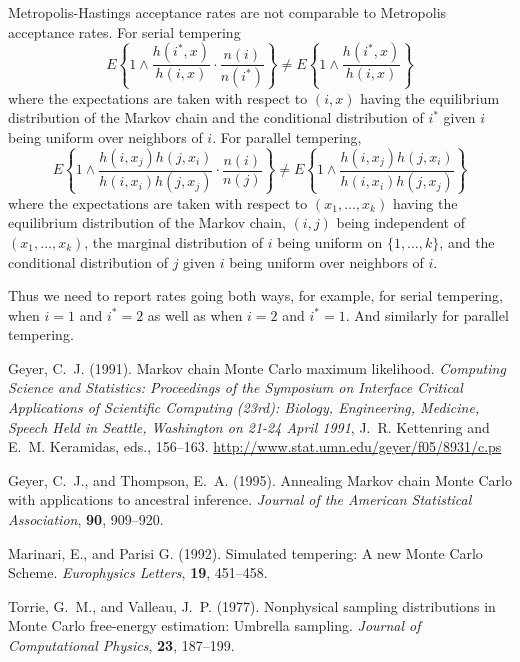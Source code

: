 \documentclass[11pt]{article}
\begin{document}
Metropolis-Hastings acceptance rates are not comparable
to Metropolis acceptance rates.  For serial tempering
$$
   E \left\{ 1 \wedge
   \frac{h(i^*, x)}{h(i, x)} \cdot
   \frac{n(i)}{n(i^*)}
   \right\}
   \neq
   E \left\{ 1 \wedge
   \frac{h(i^*, x)}{h(i, x)}
   \right\}
$$
where the expectations are taken with respect to $(i, x)$ having
the equilibrium distribution of the Markov chain and
the conditional distribution of $i^*$ given $i$ being uniform over neighbors
of $i$.
For parallel tempering,
$$
   E \left\{ 1 \wedge
   \frac{h(i, x_j) h(j, x_i)}{h(i, x_i) h(j, x_j)} \cdot
   \frac{n(i)}{n(j)}
   \right\}
   \neq
   E \left\{ 1 \wedge
   \frac{h(i, x_j) h(j, x_i)}{h(i, x_i) h(j, x_j)}
   \right\}
$$
where the expectations are taken with respect to $(x_1, \ldots, x_k)$ having
the equilibrium distribution of the Markov chain, $(i, j)$ being independent
of $(x_1, \ldots, x_k)$, the marginal distribution of $i$ being uniform on
$\{ 1, \ldots, k \}$, and the conditional distribution of $j$ given $i$ being
uniform over neighbors of $i$.

Thus we need to report rates going both ways, for example,
for serial tempering, when $i = 1$ and $i^* = 2$
as well as when $i = 2$ and $i^* = 1$.
And similarly for parallel tempering.

\begin{thebibliography}{}

Geyer, C.~J. (1991).
\newblock Markov chain Monte Carlo maximum likelihood.
\newblock \emph{Computing Science and Statistics: Proceedings of the Symposium
    on Interface Critical Applications of Scientific Computing (23rd): Biology,
    Engineering, Medicine, Speech Held in Seattle, Washington on 21-24 April
    1991}, J.~R. Kettenring and E.~M. Keramidas, eds., 156--163.
\newblock \url{http://www.stat.umn.edu/geyer/f05/8931/c.ps}

Geyer, C.~J., and Thompson, E.~A. (1995).
\newblock Annealing Markov chain Monte Carlo with applications to ancestral
    inference.
\newblock \emph{Journal of the American Statistical Association}, \textbf{90},
    909--920.

Marinari, E., and Parisi G. (1992).
\newblock Simulated tempering: A new Monte Carlo Scheme.
\newblock \emph{Europhysics Letters}, \textbf{19}, 451--458.

Torrie, G.~M., and Valleau, J.~P. (1977).
\newblock Nonphysical sampling distributions in Monte Carlo free-energy
  estimation: Umbrella sampling.
\newblock \emph{Journal of Computational Physics}, \textbf{23}, 187--199.

\end{thebibliography}
\end{document}
